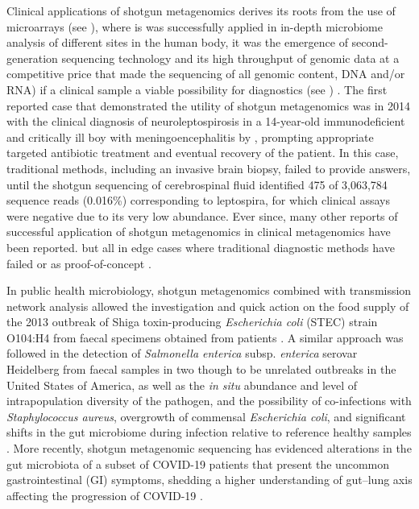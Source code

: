 Clinical applications of shotgun metagenomics derives its roots from the use of microarrays (see ), where is was successfully applied in in-depth microbiome analysis of different sites in the human body, it was the emergence of second-generation sequencing technology and its high throughput of genomic data at a competitive price that made the sequencing of all genomic content, DNA and/or RNA) if a clinical sample a viable possibility for diagnostics (see ) \citep{miller_basic_2009, palmer_rapid_2006, chiu_clinical_2019}. The first reported case that demonstrated the utility of shotgun metagenomics was in 2014 with the clinical diagnosis of neuroleptospirosis in a 14-year-old immunodeficient and critically ill boy with meningoencephalitis by \cite{wilson_actionable_2014}, prompting appropriate targeted antibiotic treatment and eventual recovery of the patient. In this case, traditional methods, including an invasive brain biopsy, failed to provide answers, until the shotgun sequencing of cerebrospinal fluid identified 475 of 3,063,784 sequence reads (0.016\%) corresponding to leptospira, for which clinical assays were negative due to its very low abundance. Ever since, many other reports of successful application of shotgun metagenomics in clinical metagenomics have been reported. but all in edge cases where traditional diagnostic methods have failed or as proof-of-concept \citep{couto_critical_2018, vijayvargiya_application_2019, sanabria_shotgun-metagenomics_2020, hirakata_application_2021}. 

In public health microbiology, shotgun metagenomics combined with transmission network analysis allowed the investigation and quick action on the food supply of the 2013 outbreak of Shiga toxin-producing \textit{Escherichia coli} (STEC) strain O104:H4 from faecal specimens obtained from patients \citep{loman_culture-independent_2013}. A similar approach was followed in the detection of \textit{Salmonella enterica} subsp. \textit{enterica} serovar Heidelberg from faecal samples in two though to be unrelated outbreaks in the United States of America, as well as the \textit{in situ} abundance and level of intrapopulation diversity of the pathogen, and the possibility of co-infections with \textit{Staphylococcus aureus}, overgrowth of commensal \textit{Escherichia coli}, and significant shifts in the gut microbiome during infection relative to reference healthy samples \citep{huang_metagenomics_2017}. More recently, shotgun metagenomic sequencing has evidenced alterations in the gut microbiota of a subset of COVID-19 patients that present the uncommon gastrointestinal (GI) symptoms, shedding a higher understanding of gut–lung axis affecting the progression of COVID-19 \citep{li_microbiome_2021}.

